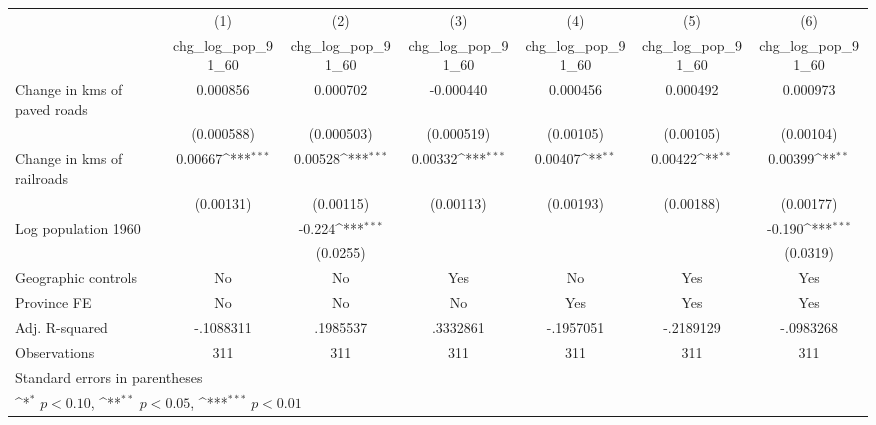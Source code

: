 {
\def\sym#1{\ifmmode^{#1}\else\(^{#1}\)\fi}
\begin{tabular}{l*{6}{c}}
\hline\hline
                    &\multicolumn{1}{c}{(1)}&\multicolumn{1}{c}{(2)}&\multicolumn{1}{c}{(3)}&\multicolumn{1}{c}{(4)}&\multicolumn{1}{c}{(5)}&\multicolumn{1}{c}{(6)}\\
                    &\multicolumn{1}{c}{chg\_log\_pop\_91\_60}&\multicolumn{1}{c}{chg\_log\_pop\_91\_60}&\multicolumn{1}{c}{chg\_log\_pop\_91\_60}&\multicolumn{1}{c}{chg\_log\_pop\_91\_60}&\multicolumn{1}{c}{chg\_log\_pop\_91\_60}&\multicolumn{1}{c}{chg\_log\_pop\_91\_60}\\
\hline
Change in kms of paved roads&    0.000856         &    0.000702         &   -0.000440         &    0.000456         &    0.000492         &    0.000973         \\
                    &  (0.000588)         &  (0.000503)         &  (0.000519)         &   (0.00105)         &   (0.00105)         &   (0.00104)         \\
[1em]
Change in kms of railroads&     0.00667\sym{***}&     0.00528\sym{***}&     0.00332\sym{***}&     0.00407\sym{**} &     0.00422\sym{**} &     0.00399\sym{**} \\
                    &   (0.00131)         &   (0.00115)         &   (0.00113)         &   (0.00193)         &   (0.00188)         &   (0.00177)         \\
[1em]
Log population 1960 &                     &      -0.224\sym{***}&                     &                     &                     &      -0.190\sym{***}\\
                    &                     &    (0.0255)         &                     &                     &                     &    (0.0319)         \\
\hline
Geographic controls &          No         &          No         &         Yes         &          No         &         Yes         &         Yes         \\
Province FE         &          No         &          No         &          No         &         Yes         &         Yes         &         Yes         \\
Adj. R-squared      &   -.1088311         &    .1985537         &    .3332861         &   -.1957051         &   -.2189129         &   -.0983268         \\
Observations        &         311         &         311         &         311         &         311         &         311         &         311         \\
\hline\hline
\multicolumn{7}{l}{\footnotesize Standard errors in parentheses}\\
\multicolumn{7}{l}{\footnotesize \sym{*} \(p<0.10\), \sym{**} \(p<0.05\), \sym{***} \(p<0.01\)}\\
\end{tabular}
}
